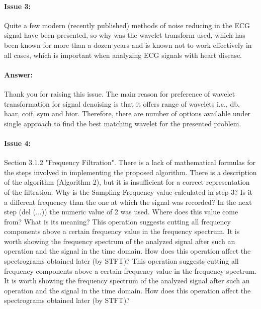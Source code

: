 \documentclass{article}
\begin{document}
\paragraph{Issue 3:}
\begin{displayquote}
Quite a few modern (recently published) methods of noise reducing in the ECG signal have been presented, so why was the wavelet transform used, which has been known for more than a dozen years and is known not to work effectively in all cases, which is important when analyzing ECG signals with heart disease.
\end{displayquote}

\paragraph{Answer:}
Thank you for raising this issue. The main reason for preference of wavelet transformation for signal denoising is that it offers range of wavelets i.e., db, haar, coif, sym and bior. Therefore, there are number of options available under single approach to find the best matching wavelet for the presented problem. 

\paragraph{Issue 4:}
\begin{displayquote}
Section 3.1.2 "Frequency Filtration". There is a lack of mathematical formulas for the steps involved in implementing the proposed algorithm. There is a description of the algorithm (Algorithm 2), but it is insufficient for a correct representation of the filtration. Why is the Sampling Frequency  value calculated in step 3? Is it a different frequency than the one at which the signal was recorded? In the next step (del (...)) the numeric value of 2 was used. Where does this value come from? What is its meaning? This operation suggests cutting all frequency components above a certain frequency value in the frequency spectrum. It is worth showing the frequency spectrum of the analyzed signal after such an operation and the signal in the time domain. How does this operation affect the spectrograms obtained later (by STFT)? This operation suggests cutting all frequency components above a certain frequency value in the frequency spectrum. It is worth showing the frequency spectrum of the analyzed signal after such an operation and the signal in the time domain. How does this operation affect the spectrograms obtained later (by STFT)?
\end{displayquote}
\end{document}
